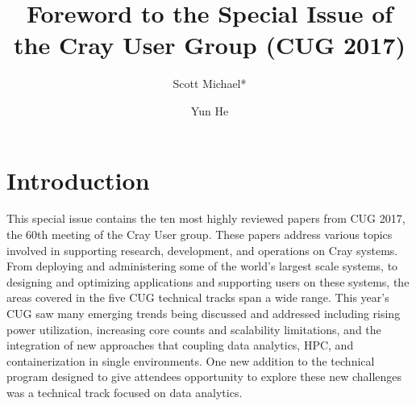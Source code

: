 \documentclass[AMA,LATO1COL,demo]{WileyNJD-v2}
\begin{document}
\title{Foreword to the Special Issue of the Cray User Group (CUG 2017)}

\author[1]{Scott Michael*}

\author[2]{Yun He}




\address[1]{, , }

\address[2]{, , }




\keywords{}

\maketitle

\section{Introduction}\label{sec:intro}

This special issue contains the ten most highly reviewed papers from
CUG 2017, the 60th meeting of the Cray User group. These papers address various topics
involved in supporting research, development, and operations on Cray systems. From
deploying and administering some of the world's largest scale systems, to designing and
optimizing applications and supporting users on these systems, the areas covered in the
five CUG technical tracks span a wide range. This year's CUG saw many emerging trends
being discussed and addressed including rising power utilization, increasing core counts
and scalability limitations, and the integration of new approaches that coupling data
analytics, HPC, and containerization in single environments. One new addition to the
technical program designed to give attendees opportunity to explore these new challenges
was a technical track focused on data analytics.
\end{document}

